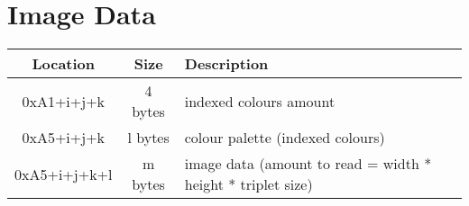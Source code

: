 \documentclass{article}
\begin{document}
\section{Image Data}
\begin{longtable}{|c|c|l|}
\hline
\textbf{Location} & \textbf{Size} & \textbf{Description} \\
\hline
0xA1+i+j+k   & 4 bytes & indexed colours amount \\
0xA5+i+j+k   & l bytes & colour palette (indexed colours) \\
0xA5+i+j+k+l & m bytes & image data (amount to read = width * height * triplet size) \\
\hline
\end{longtable}
\end{document}
